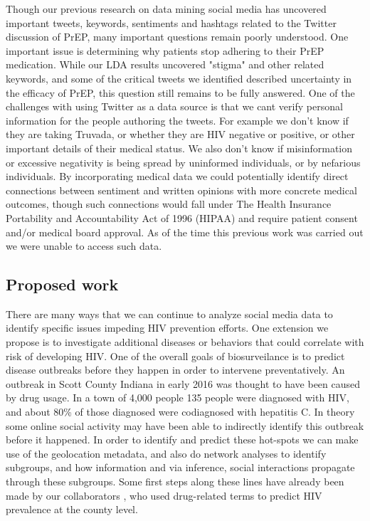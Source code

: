 Though our previous research on data mining social media has uncovered important tweets, keywords, sentiments and hashtags related to the Twitter discussion of PrEP, many important questions remain poorly understood. One important issue is determining why patients stop adhering to their PrEP medication. While our LDA results uncovered "stigma" and other related keywords, and some of the critical tweets we identified described uncertainty in the efficacy of PrEP, this question still remains to be fully answered. One of the challenges with using Twitter as a data source is that we cant verify personal information for the people authoring the tweets. For example we don't know if they are taking Truvada, or whether they are HIV negative or positive, or other important details of their medical status. We also don't know if misinformation or excessive negativity is being spread by uninformed individuals, or by nefarious individuals. By incorporating medical data we could potentially identify direct connections between sentiment and written opinions with more concrete medical outcomes, though such connections would fall under The Health Insurance Portability and Accountability Act of 1996 (HIPAA) and require patient consent and/or medical board approval. As of the time this previous work was carried out we were unable to access such data.

\subsection{Proposed work}

There are many ways that we can continue to analyze social media data to identify specific issues impeding HIV prevention efforts. One extension we propose is to investigate additional diseases or behaviors that could correlate with risk of developing HIV. One of the overall goals of biosurveilance is to predict disease outbreaks before they happen in order to intervene preventatively. An outbreak in Scott County Indiana in early 2016 was thought to have been caused by drug usage. In a town of 4,000 people 135 people were diagnosed with HIV, and about 80\% of those diagnosed were codiagnosed with hepatitis C. In theory some online social activity may have been able to indirectly identify this outbreak before it happened\cite{conrad2015community}. In order to identify and predict these hot-spots we can make use of the geolocation metadata, and also do network analyses to identify subgroups, and how information and via inference, social interactions propagate through these subgroups. Some first steps along these lines have already been made by our collaborators \cite{young2014methods}, who used drug-related terms to predict HIV prevalence at the county level. 

